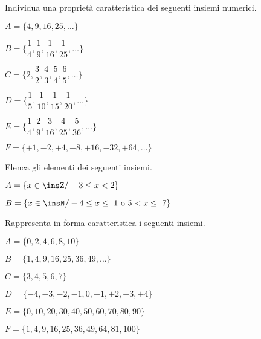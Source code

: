 \newpage %

\begin{esercizio}
Individua una proprietà caratteristica dei seguenti insiemi numerici.
\label{ese:6.18}
\begin{multicols}{2}
\begin{enumeratea}
\spazielenx
 \item \(A=\{4,9,16,25,\ldots\}\)
 \item 
\(B=\bigg\{\dfrac{1}{4},\dfrac{1}{9},\dfrac{1}{16},\dfrac{1}{25},\ldots\bigg\}\)
 \item 
\(C=\bigg\{2,\dfrac{3}{2},\dfrac{4}{3},\dfrac{5}{4},\dfrac{6}{5},\ldots\bigg\}\)
 \item 
\(D=\bigg\{\dfrac{1}{5},\dfrac{1}{10},\dfrac{1}{15},\dfrac{1}{20},\ldots\bigg\}\)
 \item 
\(E=\bigg\{\dfrac{1}{4},\dfrac{2}{9},\dfrac{3}{16},\dfrac{4}{25},\dfrac{5}{36},
\ldots\bigg\}\)
 \item \(F=\{+1, -2, +4, -8, +16, -32, +64, \ldots\}\)
 \end{enumeratea}
\end{multicols}
\end{esercizio}

\begin{esercizio}
\label{ese:6.19}
Elenca gli elementi dei seguenti insiemi.
\begin{multicols}{2}
\begin{enumeratea}
\item \(A=\{x\in\insZ/-3\le x<2\}\)
\item \(B=\{x\in\insN/-4\le x\le~1\text{ o }5<x\le~7\}\)
\end{enumeratea}
\end{multicols}
\end{esercizio}

\begin{esercizio}
\label{ese:6.20}
Rappresenta in forma caratteristica i seguenti insiemi.
\begin{multicols}{2}
\begin{enumeratea}
\item \(A=\{0, 2, 4, 6, 8, 10\}\)
\item \(B=\{1, 4, 9, 16, 25, 36,49, \ldots\}\)
\item \(C=\{3, 4, 5, 6, 7\}\)
\item \(D=\{-4, -3, -2, -1, 0, +1, +2, +3, +4\}\)
\item \(E=\{0, 10, 20, 30, 40, 50, 60, 70, 80, 90\}\)
\item \(F=\{1, 4, 9, 16, 25, 36, 49, 64, 81, 100\}\)
\end{enumeratea}
\end{multicols}
\end{esercizio}

